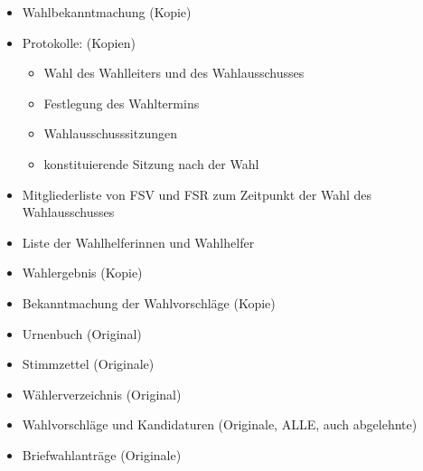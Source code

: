 \documentclass[a4paper]{scrartcl}
\begin{document}
\begin{itemize}[label=$\Box$]
\item Wahlbekanntmachung (Kopie)
\item Protokolle: (Kopien)
\begin{itemize}[label=$\Box$]
\item Wahl des Wahlleiters und des  Wahlausschusses
\item Festlegung des Wahltermins
\item Wahlausschusssitzungen
\item konstituierende Sitzung nach der Wahl
\end{itemize}

\item Mitgliederliste von FSV und FSR zum Zeitpunkt der Wahl des Wahlausschusses

\item Liste der Wahlhelferinnen und Wahlhelfer

\item Wahlergebnis (Kopie)

\item Bekanntmachung der Wahlvorschläge (Kopie)

\item Urnenbuch (Original)

\item Stimmzettel (Originale)

\item Wählerverzeichnis (Original)

\item Wahlvorschläge und Kandidaturen (Originale, ALLE, auch abgelehnte)

\item Briefwahlanträge (Originale)
\end{itemize}





\end{document}

